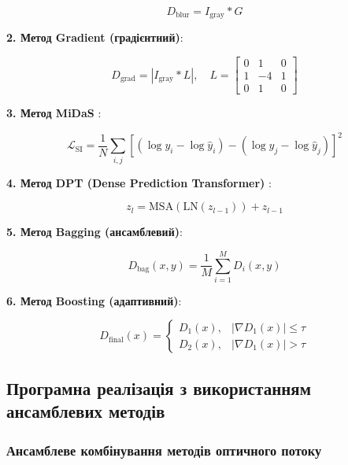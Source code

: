 \documentclass[14pt, a4paper]{extarticle}
\numberwithin{equation}{section}
\begin{document}
\begin{equation}
D_{\text{blur}} = I_{\text{gray}} * G \tag{4.16}
\end{equation}

\textbf{2. Метод Gradient (градієнтний)}:

\begin{equation}
D_{\text{grad}} = |I_{\text{gray}} * L|, \quad L = \begin{bmatrix}0&1&0\\1&-4&1\\0&1&0\end{bmatrix} \tag{4.17}
\end{equation}

\textbf{3. Метод MiDaS} \cite{ranftl2020towards}:

\begin{equation}
\mathcal{L}_{\text{SI}} = \frac{1}{N} \sum_{i,j} \left[ (\log y_i - \log \hat{y}_i) - (\log y_j - \log \hat{y}_j) \right]^2 \tag{4.18}
\end{equation}

\textbf{4. Метод DPT (Dense Prediction Transformer)} \cite{ranftl2021vision}:

\begin{equation}
z_l = \text{MSA}(\text{LN}(z_{l-1})) + z_{l-1} \tag{4.19}
\end{equation}

\textbf{5. Метод Bagging (ансамблевий)}:

\begin{equation}
D_{\text{bag}}(x,y) = \frac{1}{M} \sum_{i=1}^{M} D_i(x,y) \tag{4.20}
\end{equation}

\textbf{6. Метод Boosting (адаптивний)}:

\begin{equation}
D_{\text{final}}(x) = \begin{cases} 
D_1(x), & |\nabla D_1(x)| \leq \tau \\ 
D_2(x), & |\nabla D_1(x)| > \tau 
\end{cases} \tag{4.21}
\end{equation}

\subsection{Програмна реалізація з використанням ансамблевих методів}

\subsubsection{Ансамблеве комбінування методів оптичного потоку}
\end{document}
